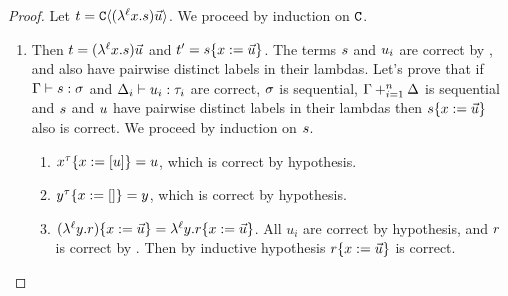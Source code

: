 \begin{proof}
Let $t = \mathtt{C}\langle(\lambda^{\ell} x. s) \vec{u}\rangle$. We proceed by induction on $\mathtt{C}$.
\begin{enumerate}
\item {}
  Then $t = (\lambda^{\ell} x. s) \vec{u}$
  and $t' = s\{x := \vec{u}\}$.
  The terms $s$ and $u_i$ are correct by ,
    and also have pairwise distinct labels in their lambdas.
  Let's prove that if $\Gamma \vdash s : \sigma$ and $\Delta_i \vdash u_i : \tau_i$
    are correct, $\sigma$ is sequential, $\Gamma +_{i=1}^n \Delta$ is sequential and
    $s$ and $u$ have pairwise distinct labels in their lambdas then
    $s\{x := \vec{u}\}$ also is correct.
  We proceed by induction on $s$.
  \begin{enumerate}
  \item {}
    $x^{\tau}\{x := [u]\} = u$, which is correct by hypothesis.
  \item {}
    $y^{\tau}\{x := []\} = y$, which is correct by hypothesis.
  \item {}
    $(\lambda^{\ell} y. r)\{x := \vec{u}\} = 
     \lambda^{\ell} y. r\{x := \vec{u}\}$. All $u_i$ are correct by hypothesis, and
     $r$ is correct by .
     Then by inductive hypothesis 
     $r\{x := \vec{u}\}$ is correct.


\end{enumerate}
\end{enumerate}
\end{proof}
